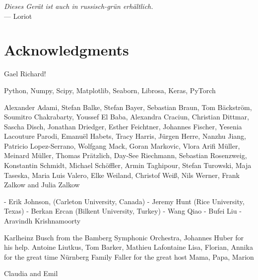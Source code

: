 
\begin{flushright}{\slshape
    Dieses Gerät ist auch in russisch-grün erhältlich.
    }\\ \medskip
    --- Loriot
\end{flushright}



\bigskip

\begingroup
\let\clearpage\relax
\let\cleardoublepage\relax
\let\cleardoublepage\relax
\chapter*{Acknowledgments}

Gael Richard!

Python, Numpy, Scipy, Matplotlib, Seaborn, Librosa, Keras, PyTorch

Alexander Adami, Stefan Balke, Stefan Bayer, Sebastian Braun, Tom Bäckström, Soumitro Chakrabarty, 
Youssef El Baba,  Alexandra Craciun, Christian Dittmar, Sascha Disch, Jonathan Driedger, Esther Feichtner, Johannes Fischer, 
Yesenia Lacouture Parodi, Emanuël Habets, Tracy Harris, Jürgen Herre, Nanzhu Jiang, 
Patricio Lopez-Serrano, Wolfgang Mack, Goran Markovic, Vlora Arifi Müller, Meinard Müller, Thomas Prätzlich, 
Day-See Riechmann, Sebastian Rosenzweig, Konstantin Schmidt, Michael Schöffler, Armin Taghipour, 
Stefan Turowski, Maja Taseska, Maria Luis Valero, Elke Weiland, Christof Weiß, Nils Werner, 
Frank Zalkow and Julia Zalkow

- Erik Johnson, (Carleton University, Canada) 
- Jeremy Hunt (Rice University, Texas)
- Berkan Ercan (Bilkent University, Turkey)
- Wang Qiao
- Bufei Liu
- Aravindh Krishnamoorty








\bigskip
Karlheinz Busch from the Bamberg Symphonic Orchestra, Johannes Huber for his help.
Antoine Liutkus, Tom Barker, Mathieu Lafontaine
\bigskip
Lisa, Florian, Annika for the great time Nürnberg
\bigskip
Family Faller for the great host
Mama, Papa, Marion

\bigskip

Claudia and Emil

\endgroup
